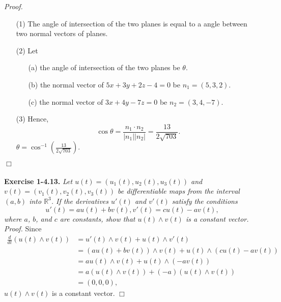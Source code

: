 \documentclass{article}
\begin{document}
\emph{Proof.}
\begin{enumerate}
\item[(1)]
The angle of intersection of the two planes
is equal to a angle between two normal vectors of planes.
\item[(2)]
Let
  \begin{enumerate}
  \item[(a)]
  the angle of intersection of the two planes be $\theta$.
  \item[(b)]
  the normal vector of $5x+3y+2z-4=0$ be $n_1 = (5,3,2)$.
  \item[(c)]
  the normal vector of $3x+4y-7z=0$ be $n_2 = (3,4,-7)$.
  \end{enumerate}
\item[(3)]
Hence,
$$\cos\theta = \frac{n_1 \cdot n_2}{|n_1||n_2|} = \frac{13}{2\sqrt{703}}.$$
$\theta = \cos^{-1}\left( \frac{13}{2\sqrt{703}} \right)$.
\end{enumerate}
$\Box$ \\\\






\textbf{Exercise 1-4.13.}
\emph{Let $u(t) = (u_1(t), u_2(t), u_3(t))$ and $v(t) = (v_1(t), v_2(t), v_3(t))$
be differentiable maps from the interval $(a,b)$ into $\mathbb{R}^3$.
If the derivatives $u'(t)$ and $v'(t)$ satisfy the conditions
$$u'(t) = au(t) + bv(t), v'(t) = cu(t) - av(t),$$
where $a$, $b$, and $c$ are constants, show that
$u(t) \wedge v(t)$ is a constant vector.} \\

\emph{Proof.}
Since
\begin{align*}
  \frac{d}{dt}(u(t) \wedge v(t))
  &= u'(t) \wedge v(t) + u(t) \wedge v'(t) \\
  &= (au(t) + bv(t))\wedge v(t) + u(t) \wedge (cu(t) - av(t)) \\
  &= au(t) \wedge v(t) + u(t) \wedge (-av(t)) \\
  &= a(u(t) \wedge v(t)) + (-a)(u(t) \wedge v(t)) \\
  &= (0, 0, 0),
\end{align*}
$u(t) \wedge v(t)$ is a constant vector.
$\Box$ \\\\



\end{document}
